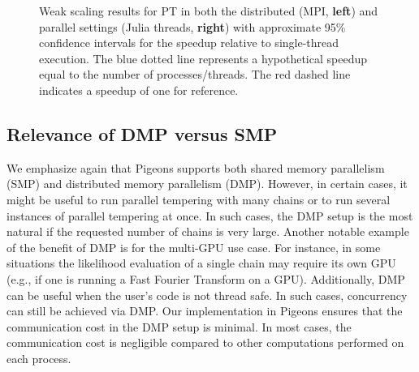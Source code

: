 \begin{figure}[t]
\begin{minipage}{0.4\textwidth}
    \end{minipage}
    \caption{
        Weak scaling results for PT in both the distributed (MPI, {\bf left}) and parallel settings (Julia threads, {\bf right})  
        with approximate 95\% confidence intervals for the speedup relative to single-thread execution.   
        The blue dotted line represents a hypothetical speedup equal to the 
        number of processes/threads. 
        The red dashed line indicates a speedup of one for reference.
    }
    \label{fig:PT_scaling}
\end{figure}


\subsection{Relevance of DMP versus SMP}

We emphasize again that Pigeons supports both shared memory 
parallelism (SMP) and distributed memory parallelism (DMP). However, in certain cases, it 
might be useful to run parallel tempering with  many chains or 
to run several instances of parallel tempering at once. In such cases, 
the DMP setup is the most natural if the requested number of chains is very large. 
Another notable example of the benefit of DMP is for the multi-GPU use case. 
For instance, in some situations the likelihood evaluation of a single chain may 
require its own GPU (e.g., if one is running a Fast Fourier Transform on a GPU). 
Additionally, DMP can be useful when the user's code is not thread safe. 
In such cases, concurrency can still be achieved via DMP.
Our implementation in Pigeons ensures that the 
communication cost in the DMP setup is minimal. In most cases, the 
communication cost is negligible compared to other computations performed on each process. 

